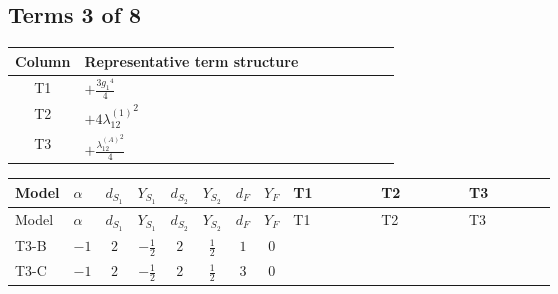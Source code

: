\documentclass[8pt]{article}
\begin{document}
\begin{landscape}
\subsection*{Terms 3 of 8}
\begin{center}
\begin{tabular}{@{}c >{\raggedright\arraybackslash}p{0.82\linewidth}@{}}
\toprule
Column & Representative term structure \\
\midrule
T1 & \(\displaystyle +\frac{3 {g_1}^4}{4}\) \\
\midrule
T2 & \(\displaystyle +4 {\lambda_{12}^{(1)}}^2\) \\
\midrule
T3 & \(\displaystyle +\frac{{\lambda_{12}^{(A)}}^2}{4}\) \\
\midrule
\bottomrule
\end{tabular}
\end{center}
\smallskip
\tiny
\begin{longtable}{@{}llcccccc >{\raggedright\arraybackslash}p{0.21\linewidth} >{\raggedright\arraybackslash}p{0.21\linewidth} >{\raggedright\arraybackslash}p{0.21\linewidth}@{}}
\toprule
Model & $\alpha$ & $d_{S_1}$ & $Y_{S_1}$ & $d_{S_2}$ & $Y_{S_2}$ & $d_F$ & $Y_F$ & T1 & T2 & T3 \\
\midrule
\endfirsthead
\toprule
Model & $\alpha$ & $d_{S_1}$ & $Y_{S_1}$ & $d_{S_2}$ & $Y_{S_2}$ & $d_F$ & $Y_F$ & T1 & T2 & T3 \\
\midrule
\endhead
T3-B & $-1$ & $2$ & $-\frac{1}{2}$ & $2$ & $\frac{1}{2}$ & $1$ & $0$ & \scriptsize\adjustbox{max width=\linewidth}{$\begin{gathered} +\frac{3 {g_1}^4}{4}\end{gathered}$} & \scriptsize\adjustbox{max width=\linewidth}{$\begin{gathered} +4 {\lambda_{12}^{(1)}}^2\end{gathered}$} & \scriptsize\adjustbox{max width=\linewidth}{$\begin{gathered} +\frac{{\lambda_{12}^{(A)}}^2}{4}\end{gathered}$} \\
\midrule
T3-C & $-1$ & $2$ & $-\frac{1}{2}$ & $2$ & $\frac{1}{2}$ & $3$ & $0$ & \scriptsize\adjustbox{max width=\linewidth}{$\begin{gathered} +\frac{3 {g_1}^4}{4}\end{gathered}$} & \scriptsize\adjustbox{max width=\linewidth}{$\begin{gathered} +4 {\lambda_{12}^{(1)}}^2\end{gathered}$} & \scriptsize\adjustbox{max width=\linewidth}{$\begin{gathered} +\frac{{\lambda_{12}^{(A)}}^2}{4}\end{gathered}$} \\

\end{longtable}
\end{landscape}
\end{document}
